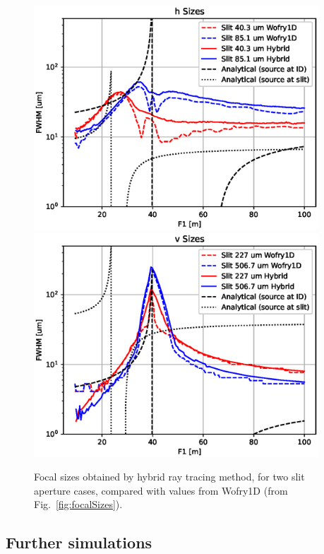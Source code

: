 \documentclass{iucr}              %
\begin{document}
\begin{figure}
    \centering

    \includegraphics[width=0.95\textwidth]{figures/sizes_h_hybrid.eps}
    \includegraphics[width=0.95\textwidth]{figures/sizes_v_hybrid.eps}
        
    \caption{Focal sizes obtained by hybrid ray tracing method, for two slit aperture cases, compared with values from Wofry1D  (from Fig.~\ref{fig:focalSizes}).}
    \label{fig:focalSizes_hybrid}
\end{figure}

\subsection{Further simulations}
\end{document}
